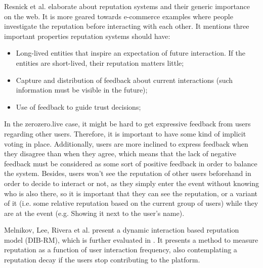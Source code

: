Resnick et al. \cite{Resnick2000} elaborate about reputation systems and their generic importance on the web. It is more geared towards e-commerce examples where people investigate the reputation before interacting with each other. It mentions three important properties reputation systems should have:
\begin{itemize}
    \item Long-lived entities that inspire an expectation of future interaction. If the entities are short-lived, their reputation matters little;
    \item Capture and distribution of feedback about current interactions (such information must be visible in the future);
    \item Use of feedback to guide trust decisions;
\end{itemize}
In the zerozero.live case, it might be hard to get expressive feedback from users regarding other users. Therefore, it is important to have some kind of implicit voting in place. Additionally, users are more inclined to express feedback when they disagree than when they agree, which means that the lack of negative feedback must be considered as some sort of positive feedback in order to balance the system. Besides, users won't see the reputation of other users beforehand in order to decide to interact or not, as they simply enter the event without knowing who is also there, so it is important that they can see the reputation, or a variant of it (i.e. some relative reputation based on the current group of users) while they are at the event (e.g. Showing it next to the user's name).

Melnikov, Lee, Rivera et al. \cite{Melnikov2018} present a dynamic interaction based reputation model (DIB-RM), which is further evaluated in \cite{Yashkina2020}. It presents a method to measure reputation as a function of user interaction frequency, also contemplating a reputation decay if the users stop contributing to the platform. 


